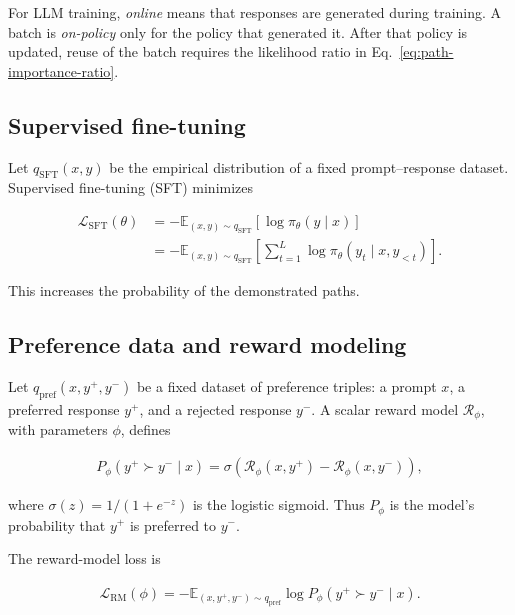 \documentclass[11pt]{article}
\newcommand{\E}{\mathbb{E}}
\begin{document}
For LLM training, \emph{online} means that responses are generated during
training.  A batch is \emph{on-policy} only for the policy that generated it.
After that policy is updated, reuse of the batch requires the likelihood ratio
in Eq.~\eqref{eq:path-importance-ratio}.

\subsection{Supervised fine-tuning}

Let \(q_{\mathrm{SFT}}(x,y)\) be the empirical distribution of a fixed
prompt--response dataset.  Supervised fine-tuning (SFT) minimizes

\begin{equation}
    \begin{split}
    \mathcal L_{\mathrm{SFT}}(\theta)
      &=-\E_{(x,y)\sim q_{\mathrm{SFT}}}
        \left[\log\pi_\theta(y\mid x)\right]\\
      &=-\E_{(x,y)\sim q_{\mathrm{SFT}}}
        \left[\sum_{t=1}^{L}
        \log\pi_\theta(y_t\mid x,y_{<t})\right].
    \end{split}
    \label{eq:sft}
\end{equation}

This increases the probability of the demonstrated paths.

\subsection{Preference data and reward modeling}

Let \(q_{\mathrm{pref}}(x,y^+,y^-)\) be a fixed dataset of preference triples:
a prompt \(x\), a preferred response \(y^+\), and a rejected response \(y^-\).
A scalar reward model \(\mathcal R_\phi\), with parameters \(\phi\), defines

\begin{equation}
    \begin{split}
    P_\phi(y^+\succ y^-\mid x)
      =\sigma\!\left(
        \mathcal R_\phi(x,y^+)-\mathcal R_\phi(x,y^-)
      \right),
    \end{split}
    \label{eq:preference-probability}
\end{equation}

where \(\sigma(z)=1/(1+e^{-z})\) is the logistic sigmoid.  Thus
\(P_\phi\) is the model's probability that \(y^+\) is preferred to \(y^-\).

The reward-model loss is

\begin{equation}
    \begin{split}
    \mathcal L_{\mathrm{RM}}(\phi)
      =-\E_{(x,y^+,y^-)\sim q_{\mathrm{pref}}}
       \log P_\phi(y^+\succ y^-\mid x).
    \end{split}
    \label{eq:reward-model-loss}
\end{equation}
\end{document}

